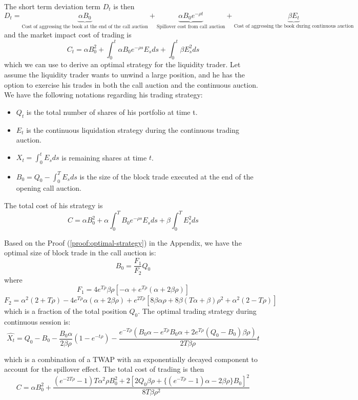 \documentclass{article}
\begin{document}
The short term deviation term $D_t$ is then
\[
  D_t = \underbrace{\alpha B_0 }_\text{Cost of aggressing the book at the end of the call auction} +
  \underbrace{\alpha B_0 e^{-\rho t}}_\text{Spillover cost from call auction} +  \underbrace{\beta E_t}_\text{Cost of aggressing the book during continuous auction}
\]
and the market impact cost of trading is
\begin{equation}\label{cost_equation_all}
  C_t = \alpha B_0^2 + \int_0^t \alpha B_0 e^{-\rho s} E_s ds + \int_0^t \beta E_s^2 ds
\end{equation}
which we can use to derive an optimal strategy for the liquidity trader. Let assume the liquidity trader wants to unwind a large position, and he has the option to exercise his trades in both the call auction and the continuous auction. We have the following notations regarding his trading strategy:

\begin{itemize}
  \item $Q_t$ is the total number of shares of his portfolio at time t.
  \item $E_t$ is the continuous liquidation strategy during the continuous trading auction.
  \item $X_t=\int_0^t E_s ds$ is remaining shares at time $t$.
  \item $B_0=Q_0 - \int_0^T E_s ds$ is the size of the block trade executed at the end of the opening call auction.
\end{itemize}

The total cost of his strategy is
\[
  C = \alpha B_0^2  + \alpha \int_0^T B_0 e^{-\rho s} E_s ds + \beta \int_0^T E_s^2 ds
\]

Based on the Proof (\ref{proof:optimal-strategy}) in the Appendix, we have the optimal size of block trade in the call auction is:
\[
  B_0 = \frac{F_1}{F_2} Q_0
\]
where
\[
  F_1 = 4 e^{T \rho} \beta \rho [-\alpha + e^{T \rho} (\alpha + 2 \beta \rho)]
\]
\[
  F_2 = \alpha^2 (2 + T \rho) - 4 e^{T \rho} \alpha (\alpha + 2 \beta \rho)
  + e^{2 T \rho} [8 \beta \alpha \rho + 8 \beta (T \alpha + \beta) \rho^2 + \alpha^2 (2 - T \rho)]
\]
which is a fraction of the total position $Q_0$. The optimal trading strategy during continuous session is:
\[
  \hat{X_t} = Q_0 - B_0  - \frac{B_0 \alpha}{2 \beta \rho}(1 - e^{-t \rho}) - \frac{e^{-T \rho} (B_0 \alpha - e^{T \rho}B_0 \alpha + 2 e^{T \rho} (Q_0 - B_0) \beta \rho )}{2 T \beta \rho} t
\]

which is a combination of a TWAP with an exponentially decayed component to account for the spillover effect. The total cost of trading is then
\[
  C = \alpha B_0^2 + \frac{(e^{-2 T \rho} - 1) T \alpha^2 \rho B_0^2 + 2 [2 Q_0 \beta \rho + \{(e^{-T \rho} - 1) \alpha - 2 \beta \rho\} B_0]^2}{8 T \beta \rho^2}
\]
\end{document}
